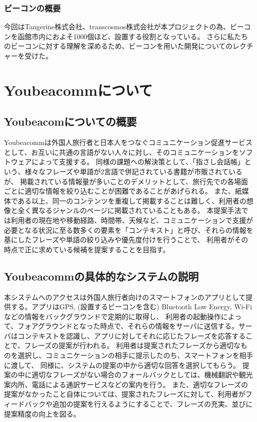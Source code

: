 \documentclass[openany,11pt,papersize]{jsbook}
\begin{document}
\subsection{ビーコンの概要}
 今回はTangerine株式会社、transcosmos株式会社が本プロジェクトの為、ビーコンを函館市内におよそ1000個ほど、設置する役割となっている。
さらに私たちのビーコンに対する理解を深めるため、ビーコンを用いた開発についてのレクチャーを受けた。



\chapter{Youbeacommについて}
\section{Youbeacomについての概要}
 Youbeacommは外国人旅行者と日本人をつなぐコミュニケーション促進サービスとして、お互いに共通の言語がない人々に対し、そのコミュニケーションをソフトウェアによって支援する。
同様の課題への解決策として、「指さし会話帳」という、様々なフレーズや単語が2言語で併記されている書籍が市販されているが、
掲載されている情報量が多いことのデメリットとして、旅行先での各場面ごとに適切な情報を絞り込むことが困難であることがあげられる。
また、紙媒体である以上、同一のコンテンツを重複して掲載することは難しく、利用者の想像と全く異なるジャンルのページに掲載されていることもある。
本提案手法では利用者の現在地や移動経路、時間帯、天候など、コミュニケーションで支援が必要となる状況に至る数多くの要素を「コンテキスト」と呼び、それらの情報を基にしたフレーズや単語の絞り込みや優先度付けを行うことで、
利用者がその時点で正に求めている候補を提案することを目指す。
\section{Youbeacommの具体的なシステムの説明}
 本システムへのアクセスは外国人旅行者向けのスマートフォンのアプリとして提供する。アプリはGPS, (設置するビーコンを含む) Bluetooth Low Energy, Wi-Fiなどの情報をバックグラウンドで定期的に取得し、
利用者の起動操作によって、フォアグラウンドとなった時点で、それらの情報をサーバに送信する。サーバはコンテキストを認識し、アプリに対してそれに応じたフレーズを応答することで、フレーズの提案が行われる。
利用者は提案されたフレーズから適切なものを選択し、コミュニケーションの相手に提示したのち、スマートフォンを相手に渡して、
同様に、システムの提案の中から適切な回答を選択してもらう。
提案の中に適切なフレーズがない場合のフォールバックとしては、機械翻訳や観光案内所、電話による通訳サービスなどの案内を行う。
また、適切なフレーズの提案がなかったこと自体については、提案されたフレーズに対して、利用者がフィードバックや追加の提案を行えるようにすることで、フレーズの充実、並びに提案精度の向上を図る。
\end{document}
